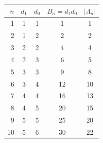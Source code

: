\begin{tabular}{rcccc}\toprule
$n$ & $d_1$ & $d_0$ & $B_n=d_1d_0$ & $|\Lambda_n|$\\\midrule
1 & 1 & 1 & 1 & 1\\
2 & 1 & 2 & 2 & 2\\
3 & 2 & 2 & 4 & 4\\
4 & 2 & 3 & 6 & 5\\
5 & 3 & 3 & 9 & 8\\
6 & 3 & 4 & 12 & 10\\
7 & 4 & 4 & 16 & 13\\
8 & 4 & 5 & 20 & 15\\
9 & 5 & 5 & 25 & 20\\
10 & 5 & 6 & 30 & 22\\
\bottomrule\end{tabular}
